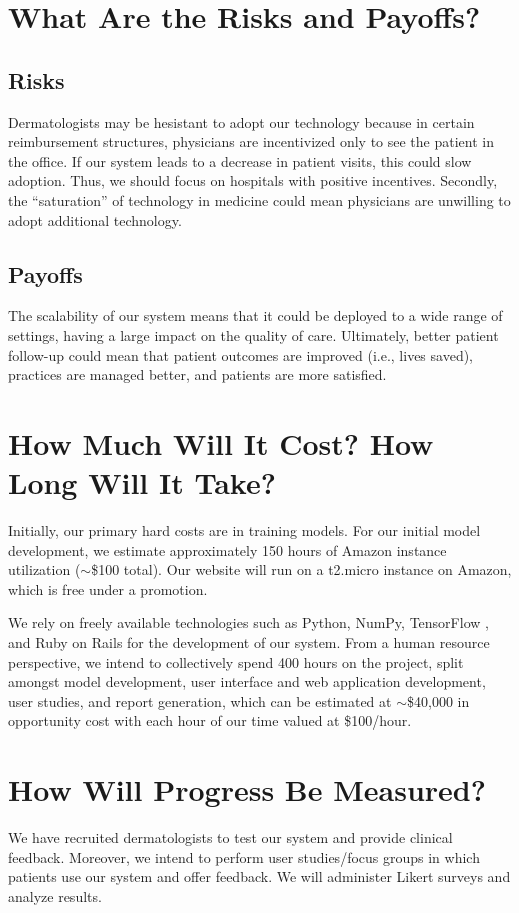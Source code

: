 \documentclass[a4paper,12pt]{article}
\begin{document}
\section{What Are the Risks and Payoffs?}

\subsection{Risks}
Dermatologists may be hesistant to adopt our technology because in certain
reimbursement structures, physicians are incentivized only to see the
patient in the office. If our system leads to a decrease in patient visits,
this could slow adoption. Thus, we should focus on hospitals with positive
incentives. Secondly, the ``saturation'' of technology in medicine
\cite{boonstra2014implementing} could mean physicians are unwilling to adopt
additional technology.

\subsection{Payoffs}
The scalability of our system means that it could be deployed to a wide range
of settings, having a large impact on the quality of care. Ultimately, better
patient follow-up could mean that patient outcomes are improved (i.e., lives
saved), practices are managed better, and patients are more satisfied.

\section{How Much Will It Cost? How Long Will It Take?}
Initially, our primary hard costs are in training models. For our
initial model development, we estimate approximately 150 hours of Amazon
instance utilization ($\sim$\$100 total). Our website will run on a t2.micro
instance on Amazon, which is free under a promotion.

We rely on freely available technologies such as Python, NumPy, TensorFlow
\cite{tensorflow2015-whitepaper}, and Ruby on Rails for the development of our
system. From a human resource perspective, we intend to collectively spend 400
hours on the project, split amongst model development, user interface and web
application development, user studies, and report generation, which can be
estimated at $\sim$\$40,000 in opportunity cost with each hour of our time
valued at \$100/hour.

\section{How Will Progress Be Measured?}
We have recruited dermatologists to test our system and provide clinical
feedback. Moreover, we intend to perform user studies/focus groups in which
patients use our system and offer feedback. We will administer Likert surveys
and analyze results.
\end{document}
